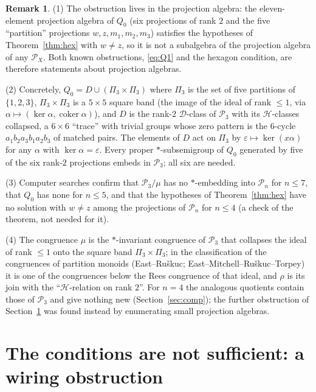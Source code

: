 \documentclass[11pt]{amsart}
\theoremstyle{definition}
\newtheorem{remark}[theorem]{Remark}
\newcommand{\D}{\mathcal{D}}
\newcommand{\Hh}{\mathcal{H}}
\renewcommand{\P}{\mathcal{P}}
\newcommand{\Part}{\Pi}
\begin{document}
\begin{remark}
(1) The obstruction lives in the projection algebra: the eleven-element projection algebra of $Q_0$ (six projections of rank $2$ and the five ``partition'' projections $w,z,m_1,m_2,m_3$) satisfies the hypotheses of Theorem~\ref{thm:hex} with $w\ne z$, so it is not a subalgebra of the projection algebra of any $\P_X$. Both known obstructions, \eqref{eq:Q1} and the hexagon condition, are therefore statements about projection algebras.

(2) Concretely, $Q_0=D\cup(\Part_3\times\Part_3)$ where $\Part_3$ is the set of five partitions of $\{1,2,3\}$, $\Part_3\times\Part_3$ is a $5\times5$ square band (the image of the ideal of rank $\le1$, via $\alpha\mapsto(\ker\alpha,\operatorname{coker}\alpha)$), and $D$ is the rank-$2$ $\D$-class of $\P_3$ with its $\Hh$-classes collapsed, a $6\times6$ ``trace'' with trivial groups whose zero pattern is the $6$-cycle $a_1b_2a_3b_1a_2b_3$ of matched pairs. The elements of $D$ act on $\Part_3$ by $\varepsilon\mapsto\ker(x\alpha)$ for any $\alpha$ with $\ker\alpha=\varepsilon$. Every proper $*$-subsemigroup of $Q_0$ generated by five of the six rank-$2$ projections embeds in $\P_3$; all six are needed.

(3) Computer searches confirm that $\P_3/\mu$ has no $*$-embedding into $\P_n$ for $n\le7$, that $Q_0$ has none for $n\le5$, and that the hypotheses of Theorem~\ref{thm:hex} have no solution with $w\ne z$ among the projections of $\P_n$ for $n\le4$ (a check of the theorem, not needed for it).

(4) The congruence $\mu$ is the $*$-invariant congruence of $\P_3$ that collapses the ideal of rank $\le1$ onto the square band $\Part_3\times\Part_3$; in the classification of the congruences of partition monoids (East--Ruškuc; East--Mitchell--Ruškuc--Torpey) it is one of the congruences below the Rees congruence of that ideal, and $\rho$ is its join with the ``$\Hh$-relation on rank $2$''. For $n=4$ the analogous quotients contain those of $\P_3$ and give nothing new (Section~\ref{sec:comp}); the further obstruction of Section~\ref{sec:wiring} was found instead by enumerating small projection algebras.
\end{remark}

\section{The conditions are not sufficient: a wiring obstruction}\label{sec:wiring}
\end{document}
